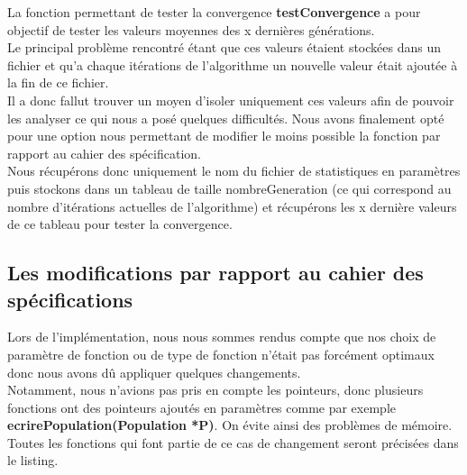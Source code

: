 \documentclass[a4paper,11pt]{article}
\begin{document}
			La fonction permettant de tester la convergence \textbf{testConvergence} a pour objectif de tester les valeurs moyennes des x dernières générations.\\
			Le principal problème rencontré étant que ces valeurs étaient stockées dans un fichier et qu’a chaque itérations de l’algorithme un nouvelle valeur était ajoutée à la fin de ce fichier.\\
			Il a donc fallut trouver un moyen d’isoler uniquement ces valeurs afin de pouvoir les analyser ce qui nous a posé quelques difficultés. Nous avons finalement opté pour une option nous permettant de modifier le moins possible la fonction par rapport au cahier des spécification.\\
			Nous récupérons donc uniquement le nom du fichier de statistiques en paramètres puis stockons dans un tableau de taille nombreGeneration (ce qui correspond au nombre d’itérations actuelles de l’algorithme) et récupérons les x dernière valeurs de ce tableau pour tester la convergence.\\

		\subsection{Les modifications par rapport au cahier des spécifications}
			Lors de l’implémentation, nous nous sommes rendus compte que nos choix de paramètre de fonction ou de type de fonction n’était pas forcément optimaux donc nous avons dû appliquer quelques changements.\\
   			Notamment, nous n’avions pas pris en compte les pointeurs, donc plusieurs fonctions ont des pointeurs ajoutés en paramètres comme par exemple \textbf{ecrirePopulation(Population *P)}. On évite ainsi des problèmes de mémoire. Toutes les fonctions qui font partie de ce cas de changement seront précisées dans le listing.\\
\end{document}
